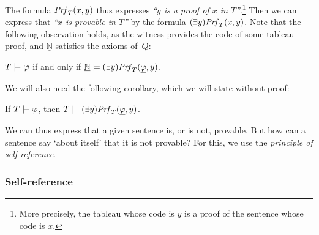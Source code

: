     The formula $\mathit{Prf}_T(x,y)$ thus expresses \emph{``$y$ is a proof of $x$ in $T$''}.\footnote{More precisely, the tableau whose code is $y$ is a proof of the sentence whose code is $x$.} Then we can express that \emph{``$x$ is provable in $T$''} by the formula $(\exists y)\mathit{Prf}_T(x,y)$. Note that the following observation holds, as the witness provides the code of some tableau proof, and $\underline{\mathbb N}$ satisfies the axioms of~$Q$:
    \begin{observation}\label{observation:proof-predicate}
    $T\proves\varphi$ if and only if $\underline{\mathbb N}\models (\exists y)\mathit{Prf}_T(\underline{\varphi},y)$.  
    \end{observation}
    We will also need the following corollary, which we will state without proof:
    \begin{corollary}\label{corollary:predicate-of-provability}
        If $T\proves\varphi$, then $T\proves (\exists y)\Prf_T(\underline{\varphi},y)$.
    \end{corollary}
    
    We can thus express that a given sentence is, or is not, provable. But how can a sentence say `about itself' that it is not provable? For this, we use the \emph{principle of self-reference}.
    
    \subsubsection*{Self-reference}
    
